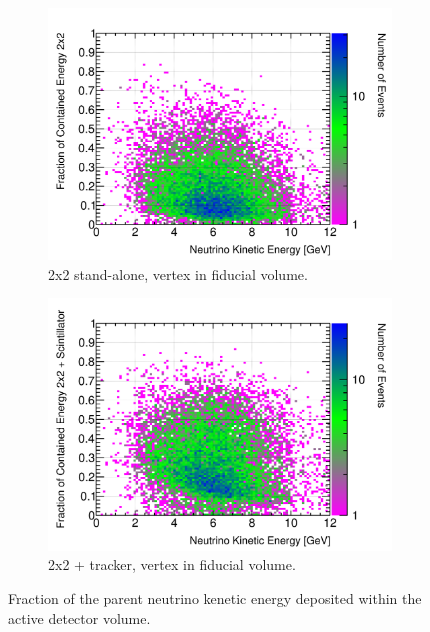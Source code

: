 \documentclass[10pt,a4paper,openany]{article}
\begin{document}
\begin{figure}[!htb]
	\begin{subfigure}[b]{0.49\textwidth}
		\centering
    \includegraphics[width=1.0\textwidth]{E_contained_frac_2x2_fiducial.png}
		\caption{2x2 stand-alone, vertex in fiducial volume.}
		\label{}
	\end{subfigure}	
	\hfill
	\begin{subfigure}[b]{0.49\textwidth}
		\centering
		\includegraphics[width=1.0\textwidth]{E_contained_frac_2x2_Scintillator_fiducial_gap.png}
		\caption{2x2 + tracker, vertex in fiducial volume.}
		\label{}
	\end{subfigure}
  \caption{Fraction of the parent neutrino kenetic energy deposited within the active detector volume.}
\end{figure}
\end{document}
